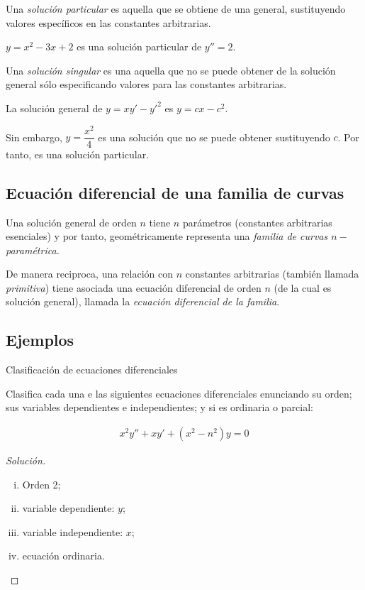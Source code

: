 {}
	Una \emph{solución particular} es aquella que se obtiene de una general, sustituyendo valores específicos en las constantes arbitrarias.

{}
	\begin{problema}
		\label{exmp 02:08}
		$ y = x^2-3x+2 $ es una solución particular de $ y''=2 $. 
	\end{problema}


	Una \emph{solución singular} es una aquella que no se puede obtener de la solución general sólo especificando valores para las constantes arbitrarias. 

{}
	\begin{problema}
		La solución general de $ y = xy'-y'^{2} $ es $ y = cx-c^{2} $. 
		
		 Sin embargo, $ y=\dfrac{x^{2}}{4} $ es una solución que no se puede obtener sustituyendo $ c $.  Por tanto, es una solución particular.
	\end{problema}

\subsection{Ecuación diferencial de una familia de curvas}
{}
Una solución general de orden $ n $ tiene $ n $ parámetros (constantes arbitrarias esenciales) y por tanto, geométricamente representa una \emph{familia de curvas $n-$paramétrica. }

{}
	De manera reciproca, una relación con $ n $ constantes arbitrarias (también llamada \emph{primitiva}) tiene asociada una ecuación diferencial de orden $n$ (de la cual es solución general), llamada la \emph{ecuación diferencial de la familia}.

\subsection{Ejemplos}
{Clasificación de ecuaciones diferenciales}
\begin{problema}
		Clasifica cada una e las siguientes ecuaciones diferenciales enunciando su orden; sus variables dependientes e independientes; y si es ordinaria o parcial:	
\end{problema}

{}
		\begin{align}
		x^2y''+xy'+\left(x^2-n^2\right)y = 0
		\end{align} 
\begin{proof}[Solución]
	\begin{enumerate}[(i)]
		\item Orden 2;
		\item variable dependiente: $ y $;
		\item variable independiente: $ x $; 
		\item ecuación ordinaria.
	\end{enumerate}
\end{proof}

